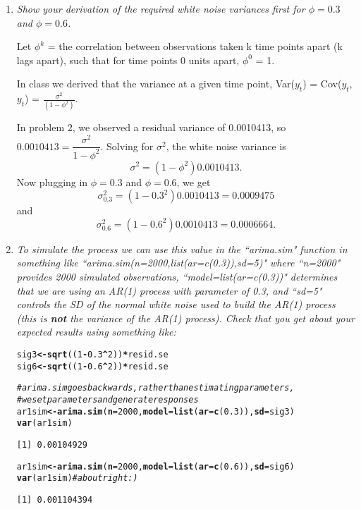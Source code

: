 \documentclass[11pt]{article}\usepackage[]{graphicx}\usepackage[]{color}
\makeatletter
\newcommand{\hlnum}[1]{\textcolor[rgb]{0,0,0}{#1}}%
\newcommand{\hlcom}[1]{\textcolor[rgb]{0.4,0.4,0.4}{\textit{#1}}}%
\newcommand{\hlopt}[1]{\textcolor[rgb]{0,0,0}{\textbf{#1}}}%
\newcommand{\hlstd}[1]{\textcolor[rgb]{0,0,0}{#1}}%
\newcommand{\hlkwb}[1]{\textcolor[rgb]{0,0,0}{\textbf{#1}}}%
\newcommand{\hlkwc}[1]{\textcolor[rgb]{0,0,0}{\textbf{#1}}}%
\newcommand{\hlkwd}[1]{\textcolor[rgb]{0,0,0}{\textbf{#1}}}%
\newenvironment{kframe}{%
 \def\at@end@of@kframe{}%
 \ifinner\ifhmode%
  \def\at@end@of@kframe{\end{minipage}}%
  \begin{minipage}{\columnwidth}%
 \fi\fi%
 \def\FrameCommand##1{\hskip\@totalleftmargin \hskip-\fboxsep
 \colorbox{shadecolor}{##1}\hskip-\fboxsep
     \hskip-\linewidth \hskip-\@totalleftmargin \hskip\columnwidth}%
 \MakeFramed {\advance\hsize-\width
   \@totalleftmargin\z@ \linewidth\hsize
   \@setminipage}}%
 {\par\unskip\endMakeFramed%
 \at@end@of@kframe}
\newenvironment{knitrout}{}{} %
\makeatother
\begin{document}
\begin{enumerate}
\begin{enumerate}
\item%
{\it Show your derivation of the required white noise variances first for $\phi=0.3$ and $\phi=0.6$.}

Let $\phi^{k}$ = the correlation between observations taken k time points apart (k lags apart), such that for time points 0 units apart, $\phi^{0}$ = 1.

In class we derived that the variance at a given time point, Var($y_{t}$) = Cov($y_{t}$,$y_{t}$) = $\frac{\sigma^2}{(1-\phi^2)}$.

In problem 2, we observed a residual variance of 0.0010413, so $0.0010413 = \dfrac{\sigma^2}{1-\phi^2}$. Solving for $\sigma^2$, the white noise variance is
$$
\sigma^2 = (1-\phi^2) 0.0010413.
$$
Now plugging in $\phi=0.3$ and $\phi=0.6$, we get
$$\sigma^2_{0.3} = (1-0.3^2) 0.0010413 = 0.0009475$$
and
$$\sigma^2_{0.6} = (1-0.6^2) 0.0010413 = 0.0006664.$$

\item%
{\it To simulate the process we can use this value in the ``arima.sim" function in something like ``arima.sim(n=2000,list(ar=c(0.3)),sd=5)" where ``n=2000" provides 2000 simulated observations, ``model=list(ar=c(0.3))" determines that we are using an AR(1) process with parameter of 0.3, and ``sd=5" controls the SD of the normal white noise used to build the AR(1) process (this is {\bf not} the variance of the AR(1) process). Check that you get about your expected results using something like:}


\begin{knitrout}\footnotesize
{}\color{fgcolor}\begin{kframe}
\begin{alltt}
\hlstd{sig3} \hlkwb{<-} \hlkwd{sqrt}\hlstd{((}\hlnum{1}\hlopt{-}\hlnum{0.3}\hlopt{^}\hlnum{2}\hlstd{))} \hlopt{*} \hlstd{resid.se}
\hlstd{sig6} \hlkwb{<-} \hlkwd{sqrt}\hlstd{((}\hlnum{1}\hlopt{-}\hlnum{0.6}\hlopt{^}\hlnum{2}\hlstd{))} \hlopt{*} \hlstd{resid.se}

\hlcom{#arima.sim goes backwards, rather than estimating parameters, }
\hlcom{#we set parameters and generate responses}
\hlstd{ar1sim}\hlkwb{<-}\hlkwd{arima.sim}\hlstd{(}\hlkwc{n}\hlstd{=}\hlnum{2000}\hlstd{,}\hlkwc{model}\hlstd{=}\hlkwd{list}\hlstd{(}\hlkwc{ar}\hlstd{=}\hlkwd{c}\hlstd{(}\hlnum{0.3}\hlstd{)),}\hlkwc{sd}\hlstd{=sig3)}
\hlkwd{var}\hlstd{(ar1sim)}
\end{alltt}
\begin{verbatim}
[1] 0.00104929
\end{verbatim}
\begin{alltt}
\hlstd{ar1sim}\hlkwb{<-}\hlkwd{arima.sim}\hlstd{(}\hlkwc{n}\hlstd{=}\hlnum{2000}\hlstd{,}\hlkwc{model}\hlstd{=}\hlkwd{list}\hlstd{(}\hlkwc{ar}\hlstd{=}\hlkwd{c}\hlstd{(}\hlnum{0.6}\hlstd{)),}\hlkwc{sd}\hlstd{=sig6)}
\hlkwd{var}\hlstd{(ar1sim)} \hlcom{# about right :)}
\end{alltt}
\begin{verbatim}
[1] 0.001104394
\end{verbatim}
\end{kframe}
\end{knitrout}


\end{enumerate}
\end{enumerate}
\end{document}
